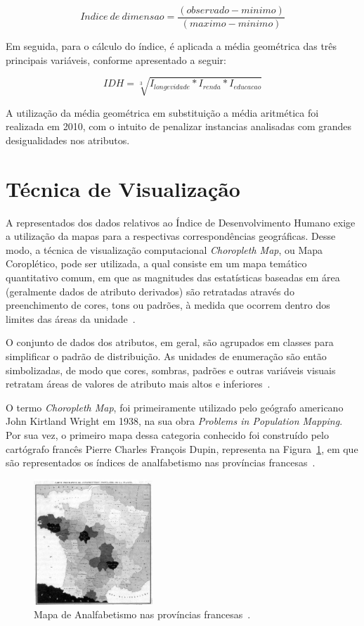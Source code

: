 \documentclass[conference]{IEEEtran}
\begin{document}
\[ Indice\: de \: dimensao = \frac{(observado - minimo)}{(maximo - minimo)} \] 

Em seguida, para o cálculo do índice, é aplicada a média geométrica  das três principais variáveis, conforme apresentado a seguir:

\[ IDH = \sqrt[3]{I_{longevidade}*I_{renda}*I_{educacao}} \]

A utilização da média geométrica em substituição a média aritmética foi realizada em 2010, com o intuito de penalizar instancias analisadas com grandes desigualidades nos atributos.

\section{Técnica de Visualização}
\label{section:tecnica}

A representados dos dados relativos ao Índice de Desenvolvimento Humano exige a utilização da mapas para a respectivas correspondências geográficas. Desse modo, a técnica de visualização computacional \textit{Choropleth Map}, ou Mapa Coroplético, pode ser utilizada, a qual consiste em um mapa temático quantitativo comum, em que as magnitudes das estatísticas baseadas em área (geralmente dados de atributo derivados) são retratadas através do preenchimento de cores, tons ou padrões, à medida que ocorrem dentro dos limites das áreas da unidade~\cite{torguson}. 

O conjunto de dados dos atributos, em geral, são agrupados em classes para simplificar o padrão de distribuição. As unidades de enumeração são então simbolizadas, de modo que cores, sombras, padrões e outras variáveis visuais retratam áreas de valores de atributo mais altos e inferiores~\cite{torguson}. 

O termo \textit{Choropleth Map}, foi primeiramente utilizado pelo geógrafo americano John Kirtland Wright em 1938, na sua obra \textit{Problems in Population Mapping}. Por sua vez, o primeiro mapa dessa categoria conhecido foi construído pelo cartógrafo francês Pierre Charles François Dupin, representa na Figura~\ref{img:analfabetismo-franca}, em que são representados os índices de analfabetismo nas províncias francesas~\cite{mac}.

\begin{figure}[!ht]
\centering
\includegraphics[width=0.4\textwidth]{analfabetismo-franca.jpg}
\caption{Mapa de Analfabetismo nas províncias francesas~\cite{mac}.}
\label{img:analfabetismo-franca}
\end{figure}
\end{document}
